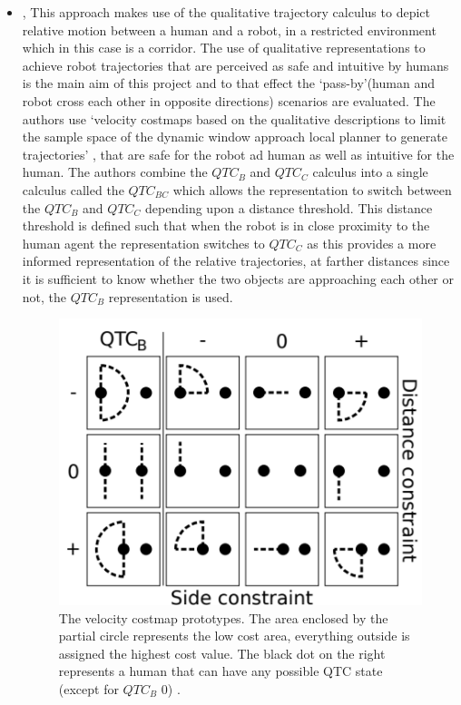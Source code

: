 \begin{itemize}
	\item \cite{dondrup2016qualitative}, This approach makes use of the qualitative trajectory calculus to depict relative motion between a human and a robot, in a restricted environment which in this case is a corridor. The use of qualitative representations to achieve robot trajectories that are perceived as safe and intuitive by humans is the main aim of this project and to that effect the `pass-by'(human and robot cross each other in opposite directions) scenarios are evaluated. The authors use `velocity costmaps based on the qualitative descriptions to limit the sample space of the dynamic window approach local planner to generate trajectories' \cite{dondrup2016qualitative}, that are safe for the robot ad human as well as intuitive for the human. The authors combine the $QTC_B$ and $QTC_C$ calculus into a single calculus called the $QTC_{BC}$ which allows the representation to switch between the $QTC_B$ and $QTC_C$ depending upon a distance threshold. This distance threshold is defined such that when the robot is in close proximity to the human agent the representation switches to $QTC_C$ as this provides a more informed representation of the relative trajectories, at farther distances since it is sufficient to know whether the two objects are approaching each other or not, the $QTC_B$ representation is used. 
	\begin{figure}[h]
		\centering
		\includegraphics[scale = 0.7]{images/qtcbc}
		\caption{The velocity costmap prototypes. The area enclosed by the partial circle represents the low cost area, everything outside is assigned the highest cost value. The black dot on the right represents a human that can have any possible QTC state (except for $QTC_B$ 0) \cite{dondrup2016qualitative}.}
		\label{fig:qtcbc}
	\end{figure}
	

\end{itemize}
